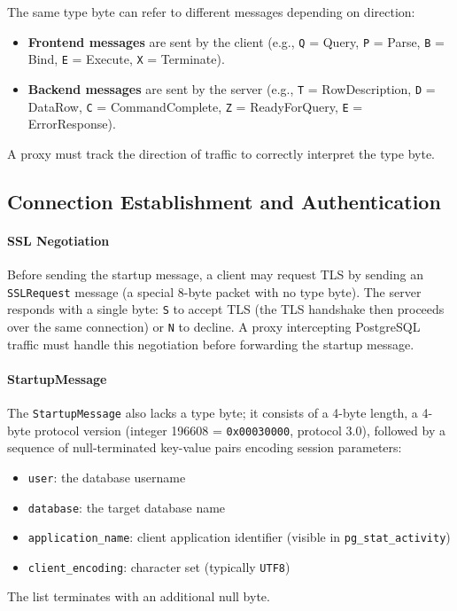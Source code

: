 The same type byte can refer to different messages depending on direction:
\begin{itemize}
    \item \textbf{Frontend messages} are sent by the client (e.g., \texttt{Q} = Query, \texttt{P} = Parse, \texttt{B} = Bind, \texttt{E} = Execute, \texttt{X} = Terminate).
    \item \textbf{Backend messages} are sent by the server (e.g., \texttt{T} = RowDescription, \texttt{D} = DataRow, \texttt{C} = CommandComplete, \texttt{Z} = ReadyForQuery, \texttt{E} = ErrorResponse).
\end{itemize}

A proxy must track the direction of traffic to correctly interpret the type byte.

\subsection{Connection Establishment and Authentication}

\paragraph{SSL Negotiation}

Before sending the startup message, a client may request TLS by sending an \texttt{SSLRequest} message (a special 8-byte packet with no type byte). The server responds with a single byte: \texttt{S} to accept TLS (the TLS handshake then proceeds over the same connection) or \texttt{N} to decline. A proxy intercepting PostgreSQL traffic must handle this negotiation before forwarding the startup message.

\paragraph{StartupMessage}

The \texttt{StartupMessage} also lacks a type byte; it consists of a 4-byte length, a 4-byte protocol version (integer 196608 = \texttt{0x00030000}, protocol 3.0), followed by a sequence of null-terminated key-value pairs encoding session parameters:
\begin{itemize}
    \item \texttt{user}: the database username
    \item \texttt{database}: the target database name
    \item \texttt{application\_name}: client application identifier (visible in \texttt{pg\_stat\_activity})
    \item \texttt{client\_encoding}: character set (typically \texttt{UTF8})
\end{itemize}
The list terminates with an additional null byte.

